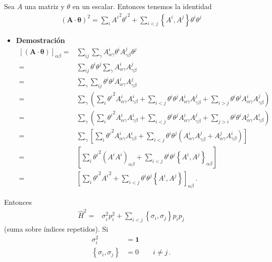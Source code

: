 Sea $A$ una matriz y $\theta$ en un escalar. Entonces tenemos la identidad
\begin{align}
  \label{eq:206qft}
  (\mathbf{A}\cdot\boldsymbol{\theta})^2=\sum_i {A^i}^2 {\theta^i}^2+\sum_{i\lt j}\left\{A^i,A^j  \right\}\theta^i \theta^j 
\end{align}
\begin{itemize}
\item \textbf{Demostración}
  \begin{align}
    \left[\left(\mathbf{A}\cdot\boldsymbol{\theta}\right)\right]_{\alpha\beta}
    =&\sum_{i j}\sum_\gamma A^i_{\alpha\gamma}\theta^iA^j_{\gamma\beta}\theta^j\nonumber\\    
    =&\sum_{i j}\theta^i\theta^j\sum_\gamma A^i_{\alpha\gamma}A^j_{\gamma\beta}\nonumber\\    
    =&\sum_\gamma \sum_{i j}\theta^i\theta^jA^i_{\alpha\gamma}A^j_{\gamma\beta}\nonumber\\    
    =&\sum_\gamma \left(\sum_{i}{\theta^i}^2A^i_{\alpha\gamma}A^i_{\gamma\beta}+\sum_{i<j}\theta^i\theta^jA^i_{\alpha\gamma}A^j_{\gamma\beta}+\sum_{i>j}\theta^i\theta^jA^i_{\alpha\gamma}A^j_{\gamma\beta}\right)\nonumber\\    
    =&\sum_\gamma \left(\sum_{i}{\theta^i}^2A^i_{\alpha\gamma}A^i_{\gamma\beta}+\sum_{i<j}\theta^i\theta^jA^i_{\alpha\gamma}A^j_{\gamma\beta}+\sum_{j>i}\theta^j\theta^iA^j_{\alpha\gamma}A^i_{\gamma\beta}\right)\nonumber\\    
    =&\sum_\gamma \left[\sum_{i}{\theta^i}^2A^i_{\alpha\gamma}A^i_{\gamma\beta}+\sum_{i<j}\theta^i\theta^j\left(A^i_{\alpha\gamma}A^j_{\gamma\beta}+A^j_{\alpha\gamma}A^i_{\gamma\beta}\right)\right]\nonumber\\    
    =&\left[\sum_{i}{\theta^i}^2\left(A^iA^i\right)_{\alpha\beta}+\sum_{i<j}\theta^i\theta^j\left\{ A^i,A^j\right\}_{\alpha\beta}\right]\nonumber\\    
    =&\left[\sum_{i}{\theta^i}^2{A^i}^2+\sum_{i<j}\theta^i\theta^j\left\{ A^i,A^j\right\}\right]_{\alpha\beta}\,.
  \end{align}

\end{itemize}
Entonces
\begin{align}
  \hat{H}^2=& \sigma_i^2p_i^2+\sum_{i\lt j}\left\{ \sigma_i, \sigma_j\right\}p_i p_j
\end{align}
(suma sobre índices repetidos). Si
\begin{align}
  \label{eq:107qft}
   \sigma_i^2&=\mathbf{1}\nonumber\\
  \left\{ \sigma_i, \sigma_j\right\}&=0\qquad i\ne j\,.
\end{align}

